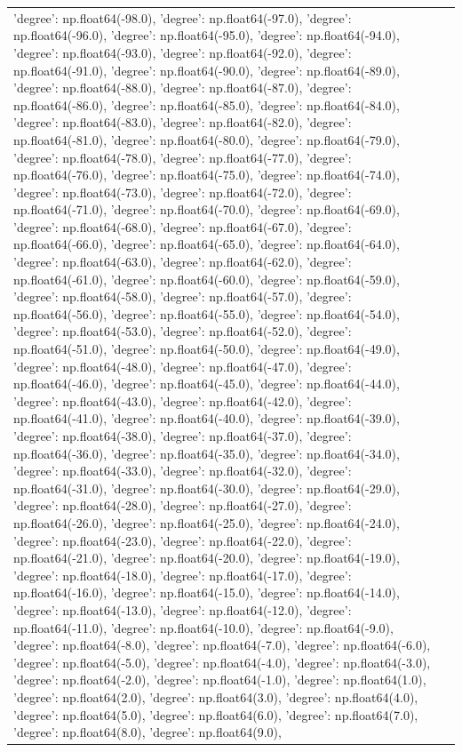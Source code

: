 \documentclass[parskip=half]{scrartcl}
\begin{document}
\begin{tabular}{l|l}
{'degree': np.float64(-98.0)}, {'degree': np.float64(-97.0)}, {'degree': np.float64(-96.0)}, {'degree': np.float64(-95.0)}, {'degree': np.float64(-94.0)}, {'degree': np.float64(-93.0)}, {'degree': np.float64(-92.0)}, {'degree': np.float64(-91.0)}, {'degree': np.float64(-90.0)}, {'degree': np.float64(-89.0)}, {'degree': np.float64(-88.0)}, {'degree': np.float64(-87.0)}, {'degree': np.float64(-86.0)}, {'degree': np.float64(-85.0)}, {'degree': np.float64(-84.0)}, {'degree': np.float64(-83.0)}, {'degree': np.float64(-82.0)}, {'degree': np.float64(-81.0)}, {'degree': np.float64(-80.0)}, {'degree': np.float64(-79.0)}, {'degree': np.float64(-78.0)}, {'degree': np.float64(-77.0)}, {'degree': np.float64(-76.0)}, {'degree': np.float64(-75.0)}, {'degree': np.float64(-74.0)}, {'degree': np.float64(-73.0)}, {'degree': np.float64(-72.0)}, {'degree': np.float64(-71.0)}, {'degree': np.float64(-70.0)}, {'degree': np.float64(-69.0)}, {'degree': np.float64(-68.0)}, {'degree': np.float64(-67.0)}, {'degree': np.float64(-66.0)}, {'degree': np.float64(-65.0)}, {'degree': np.float64(-64.0)}, {'degree': np.float64(-63.0)}, {'degree': np.float64(-62.0)}, {'degree': np.float64(-61.0)}, {'degree': np.float64(-60.0)}, {'degree': np.float64(-59.0)}, {'degree': np.float64(-58.0)}, {'degree': np.float64(-57.0)}, {'degree': np.float64(-56.0)}, {'degree': np.float64(-55.0)}, {'degree': np.float64(-54.0)}, {'degree': np.float64(-53.0)}, {'degree': np.float64(-52.0)}, {'degree': np.float64(-51.0)}, {'degree': np.float64(-50.0)}, {'degree': np.float64(-49.0)}, {'degree': np.float64(-48.0)}, {'degree': np.float64(-47.0)}, {'degree': np.float64(-46.0)}, {'degree': np.float64(-45.0)}, {'degree': np.float64(-44.0)}, {'degree': np.float64(-43.0)}, {'degree': np.float64(-42.0)}, {'degree': np.float64(-41.0)}, {'degree': np.float64(-40.0)}, {'degree': np.float64(-39.0)}, {'degree': np.float64(-38.0)}, {'degree': np.float64(-37.0)}, {'degree': np.float64(-36.0)}, {'degree': np.float64(-35.0)}, {'degree': np.float64(-34.0)}, {'degree': np.float64(-33.0)}, {'degree': np.float64(-32.0)}, {'degree': np.float64(-31.0)}, {'degree': np.float64(-30.0)}, {'degree': np.float64(-29.0)}, {'degree': np.float64(-28.0)}, {'degree': np.float64(-27.0)}, {'degree': np.float64(-26.0)}, {'degree': np.float64(-25.0)}, {'degree': np.float64(-24.0)}, {'degree': np.float64(-23.0)}, {'degree': np.float64(-22.0)}, {'degree': np.float64(-21.0)}, {'degree': np.float64(-20.0)}, {'degree': np.float64(-19.0)}, {'degree': np.float64(-18.0)}, {'degree': np.float64(-17.0)}, {'degree': np.float64(-16.0)}, {'degree': np.float64(-15.0)}, {'degree': np.float64(-14.0)}, {'degree': np.float64(-13.0)}, {'degree': np.float64(-12.0)}, {'degree': np.float64(-11.0)}, {'degree': np.float64(-10.0)}, {'degree': np.float64(-9.0)}, {'degree': np.float64(-8.0)}, {'degree': np.float64(-7.0)}, {'degree': np.float64(-6.0)}, {'degree': np.float64(-5.0)}, {'degree': np.float64(-4.0)}, {'degree': np.float64(-3.0)}, {'degree': np.float64(-2.0)}, {'degree': np.float64(-1.0)}, {'degree': np.float64(1.0)}, {'degree': np.float64(2.0)}, {'degree': np.float64(3.0)}, {'degree': np.float64(4.0)}, {'degree': np.float64(5.0)}, {'degree': np.float64(6.0)}, {'degree': np.float64(7.0)}, {'degree': np.float64(8.0)}, {'degree': np.float64(9.0)}, {'degree': 
\end{tabular}
\end{document}
